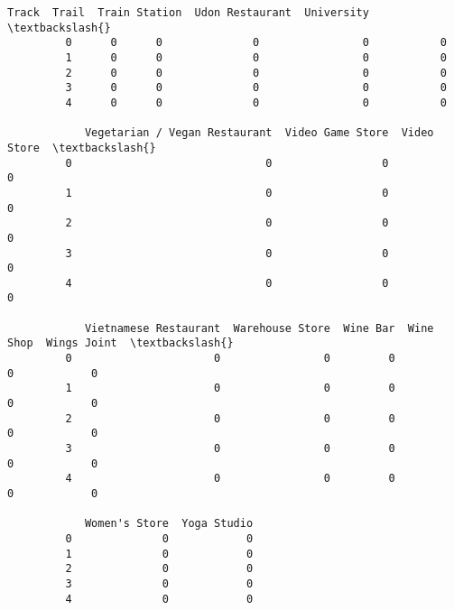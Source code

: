 \documentclass[11pt]{article}
\begin{document}
\begin{Verbatim}[commandchars=\\\{\}]
            Track  Trail  Train Station  Udon Restaurant  University  \textbackslash{}
         0      0      0              0                0           0   
         1      0      0              0                0           0   
         2      0      0              0                0           0   
         3      0      0              0                0           0   
         4      0      0              0                0           0   
         
            Vegetarian / Vegan Restaurant  Video Game Store  Video Store  \textbackslash{}
         0                              0                 0            0   
         1                              0                 0            0   
         2                              0                 0            0   
         3                              0                 0            0   
         4                              0                 0            0   
         
            Vietnamese Restaurant  Warehouse Store  Wine Bar  Wine Shop  Wings Joint  \textbackslash{}
         0                      0                0         0          0            0   
         1                      0                0         0          0            0   
         2                      0                0         0          0            0   
         3                      0                0         0          0            0   
         4                      0                0         0          0            0   
         
            Women's Store  Yoga Studio  
         0              0            0  
         1              0            0  
         2              0            0  
         3              0            0  
         4              0            0  
\end{Verbatim}
            
\end{document}

